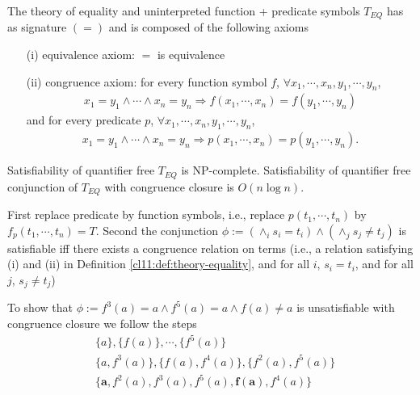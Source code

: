 


\begin{definition}[$T_{EQ}$]
\label{cl11:def:theory-equality}
The theory of equality and uninterpreted function + predicate symbols $T_{EQ}$ has as signature $(=)$ and is composed of the following axioms 
\begin{itemize}
    \item[(i)] equivalence axiom: $=$ is equivalence
    \item[(ii)] congruence axiom: for every function symbol $f$, $\forall x_1, \cdots, x_n, y_1, \cdots, y_n$,
    \begin{align*}
        x_1 = y_1 \land \cdots \land x_n=y_n \Rightarrow f(x_1, \cdots, x_n) = f(y_1, \cdots, y_n)
    \end{align*}
    and for every predicate $p$, $\forall x_1, \cdots, x_n, y_1, \cdots, y_n$, 
    \begin{align*}
         x_1 = y_1 \land \cdots \land x_n=y_n \Rightarrow p(x_1, \cdots, x_n) = p(y_1, \cdots, y_n).
    \end{align*}
\end{itemize}
\end{definition}

\begin{theorem}
Satisfiability of quantifier free $T_{EQ}$ is NP-complete. 
Satisfiability of quantifier free conjunction of $T_{EQ}$ with congruence closure is $O(n \log n)$. 
\end{theorem}

\begin{remark} 
First replace predicate by function symbols, i.e., replace $p(t_1, \cdots, t_n)$ by $ f_p(t_1, \cdots, t_n) = T $.
Second the conjunction $\phi := (\land _i s_i = t_i) \land (\land_j s_j \neq t_j)$ is satisfiable iff there exists a congruence relation on terms (i.e., a relation satisfying (i) and (ii) in Definition \ref{cl11:def:theory-equality}, and for all $i$, $s_i=t_i$, and for all $j$, $s_j \neq t_j$) 
\end{remark}
    





\begin{example} 
To show that $\phi := f^3(a) = a \land f^5(a) = a \land f(a) \neq a$ is unsatisfiable with congruence closure we follow the steps
\begin{align*}
    &\{a\}, \{f(a)\}, \cdots, \{f^5(a)\} \\
&\{a, f^3(a)\}, \{f(a), f^4(a)\}, \{f^2(a), f^5(a)\} \\
&\{\mathbf{a}, f^2(a), f^3(a), f^5(a), \mathbf{f(a)}, f^4(a)\}
\end{align*}
\end{example}


